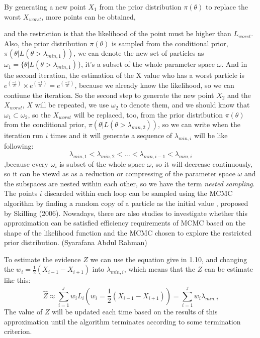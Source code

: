 \documentclass[11pt]{book}
\begin{document}
By generating a new point $X_1$ from 
the prior distribution $\pi(\theta)$ to replace the worst $X_{worst}$, more points can be obtained,

and the restriction is that the likelihood of the point must be higher than $L_{worst}$.
Also, the prior distribution $\pi(\theta)$ is sampled from the conditional prior, $\pi(\theta | L(\theta > \lambda_{min, 1}))$,
we can denote the new set of particles as $\omega_1=\{\theta|L(\theta> \lambda_{min, 1})\}$, it's a subset of the whole parameter space $\omega$.
And in the second iteration, the estimation of the X value who has a worst particle is $e^{(\frac{-1}{N})} \times e^{(\frac{-1}{N})} = e^{(\frac{-2}{N})}$,
because we already know the likelihood, so we can contiune the iteration.
So the second step to generate the new point $X_2$ and the $X_{worst}$, $X$ will be repeated, we use 
$\omega_2$ to denote them, and we should know that 
$\omega_1 \subset \omega_2$, so the $X_{worst}$ will be replaced, too, from 
the prior distribution $\pi(\theta)$ from the conditional prior, $\pi(\theta | L(\theta > \lambda_{min, 2}))$, so we can write 
when the iteration run $i$ times and it will generate a sequence of $\lambda _{min,i}$ will be like following:
\begin{equation*}
	\lambda _{min,1} < \lambda _{min,2} <  ... < \lambda _{min,i-1} < \lambda _{min,i}
\end{equation*}
,because every $\omega_i$ is subset of the whole space $\omega$, so it will 
decrease continuously, so it can be viewd as as a reduction or compressing
 of the parameter space $\omega$ and the subspaces are nested within each other, 
so we have the term \textit{nested sampling}.
The points $i$ discarded within each loop 
can be sampled using the MCMC algorithm by finding a random copy of a particle
as the initial value , proposed by Skilling (2006). Nowadays, there are also studies 
to investigate whether this approximation can be satisfied
efficiency requirements of MCMC based on 
the shape of the likelihood function and
 the MCMC chosen to explore the restricted prior distribution. (Syarafana Abdul Rahman)

 To estimate the evidence $Z$ we can use the equation give in 1.10, and changing 
 the $w_i = \frac{1}{2}(X_{i-1} -X_{i+1})$ into $\lambda _{min,i}$, which means that the $Z$ can be
 estimate like this:
 \begin{equation}
	\hat{Z} \approx \sum_{i=1}^{j}w_iL_i (w_i = \frac{1}{2}(X_{i-1} -X_{i+1})) = \sum_{i=1}^{j}w_i\lambda _{min,i}
 \end{equation}
 The value of $Z$ will be updated each time based on the results of 
 this approximation until the algorithm terminates according to
  some termination criterion.
\end{document}

